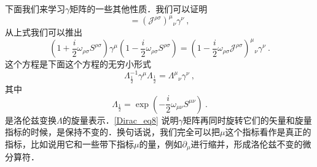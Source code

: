 下面我们来学习$\gamma$矩阵的一些其他性质．我们可以证明
\begin{equation}
[\gamma^\mu,S^{\rho\sigma}] = (\mathcal J^{\rho\sigma})^\mu{}_\nu \gamma^\nu ~,
\end{equation}
从上式我们可以推出
\begin{equation}
(1+\frac{i}{2}\omega_{\rho\sigma}S^{\rho\sigma})\gamma^\mu (1-\frac{i}{2}\omega_{\rho\sigma}S^{\rho\sigma}) = (1-\frac{i}{2}\omega_{\rho\sigma}\mathcal J^{\rho\sigma})^\mu{}_\nu \gamma^\nu~.
\end{equation}
这个方程是下面这个方程的无穷小形式
\begin{equation}\label{Dirac_eq8}
\Lambda^{-1}_{\frac{1}{2}}\gamma^\mu\Lambda_{\frac{1}{2}}= \Lambda^\mu{}_\nu\gamma^\nu~,
\end{equation}
其中
\begin{equation}
\Lambda_{\frac{1}{2}} = \exp (-\frac{i}{2}\omega_{\mu\nu}S^{\mu\nu})~. 
\end{equation}
是洛伦兹变换$\Lambda$的旋量表示．\autoref{Dirac_eq8} 说明$\gamma$矩阵再同时旋转它们的矢量和旋量指标的时候，是保持不变的．换句话说，我们完全可以把$\mu$这个指标看作是真正的指标，比如说用它和一些带下指标$\mu$的量，例如$\partial_\mu$进行缩并，形成洛伦兹不变的微分算符．


